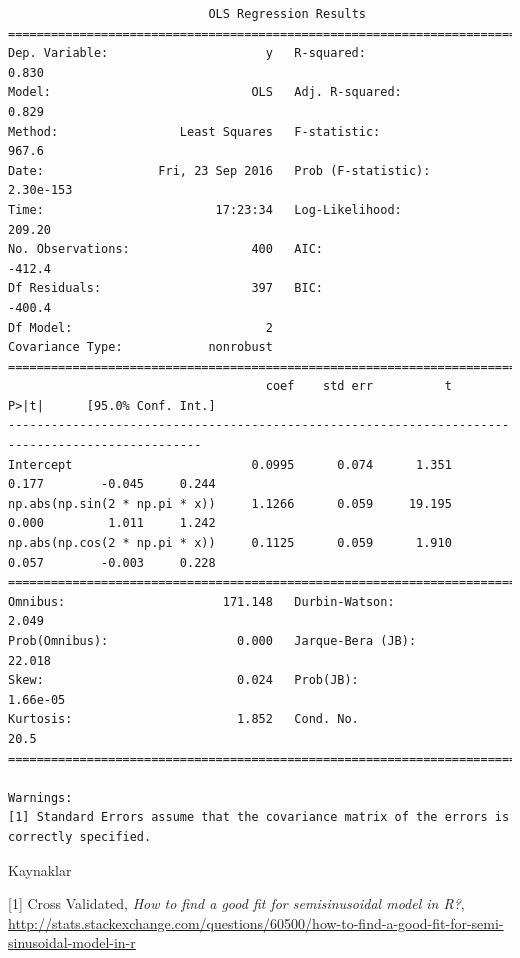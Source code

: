 \documentclass[12pt,fleqn]{article}\usepackage{../../common}
\begin{document}
\begin{verbatim}
                            OLS Regression Results                            
==============================================================================
Dep. Variable:                      y   R-squared:                       0.830
Model:                            OLS   Adj. R-squared:                  0.829
Method:                 Least Squares   F-statistic:                     967.6
Date:                Fri, 23 Sep 2016   Prob (F-statistic):          2.30e-153
Time:                        17:23:34   Log-Likelihood:                 209.20
No. Observations:                 400   AIC:                            -412.4
Df Residuals:                     397   BIC:                            -400.4
Df Model:                           2                                         
Covariance Type:            nonrobust                                         
=================================================================================================
                                    coef    std err          t      P>|t|      [95.0% Conf. Int.]
-------------------------------------------------------------------------------------------------
Intercept                         0.0995      0.074      1.351      0.177        -0.045     0.244
np.abs(np.sin(2 * np.pi * x))     1.1266      0.059     19.195      0.000         1.011     1.242
np.abs(np.cos(2 * np.pi * x))     0.1125      0.059      1.910      0.057        -0.003     0.228
==============================================================================
Omnibus:                      171.148   Durbin-Watson:                   2.049
Prob(Omnibus):                  0.000   Jarque-Bera (JB):               22.018
Skew:                           0.024   Prob(JB):                     1.66e-05
Kurtosis:                       1.852   Cond. No.                         20.5
==============================================================================

Warnings:
[1] Standard Errors assume that the covariance matrix of the errors is correctly specified.
\end{verbatim}



Kaynaklar

[1] Cross Validated, {\em How to find a good fit for semi­sinusoidal model in  R?},
\url{http://stats.stackexchange.com/questions/60500/how-to-find-a-good-fit-for-semi-sinusoidal-model-in-r}
\end{document}
